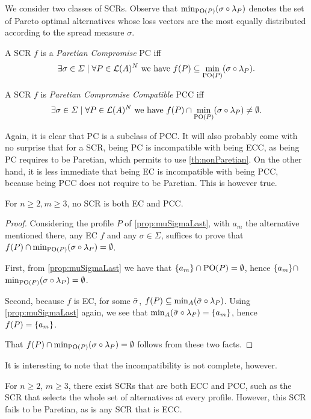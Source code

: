 We consider two classes of \acp{SCR}. 
Observe that $\mustar$ denotes the set of Pareto optimal alternatives whose loss vectors are the most equally distributed according to the spread measure $\sigma$.

\begin{definition} A \ac{SCR} $f$ is a \emph{Paretian Compromise} PC iff \[\exists \sigma \in \Sigma \suchthat \forall P \in \linors^N \text{ we have } f(P) \subseteq \mustar.\]
\end{definition}

\begin{definition} A \ac{SCR} $f$ is \emph{Paretian Compromise Compatible} PCC iff \[\exists \sigma \in \Sigma \suchthat \forall P \in \linors^N \text{ we have } f(P) \cap \mustar \neq \emptyset.\]
\end{definition}

Again, it is clear that PC is a subclass of PCC. It will also probably come with no surprise that for a \ac{SCR}, being PC is incompatible with being ECC, as being PC requires to be Paretian, which permits to use \cref{th:nonParetian}. On the other hand, it is less immediate that being EC is incompatible with
being PCC, because being PCC does not require to be Paretian. This is however true.

\begin{theorem} \label{th:incompatibility} 
	For $n ≥ 2, m ≥ 3$, no \ac{SCR} is both EC and PCC.
\end{theorem}
\begin{proof}	
	Considering the profile $P$ of \cref{prop:muSigmaLast}, with $a_m$ the alternative mentioned there, any EC $f$ and any $\sigma \in \Sigma$, suffices to prove that $f(P) \cap {\mustar[\sigma][P]} = \emptyset$.
	
	First, from \cref{prop:muSigmaLast} we have that
	$\{a_m\} \cap \text{PO}(P) = \emptyset$, hence $\{a_m\} \cap$ \break $ {\mustar[\sigma][P]} = \emptyset$. 
	
	Second, because $f$ is EC, for some $\bar{\sigma}$, $f(P) \subseteq {\musigma[\sigmatop][P]}$. Using \cref{prop:muSigmaLast} again, we see that ${\musigma[\sigmatop][P]} = \set{a_m}$, hence $f(P) = \{a_m\}$.
	
	That $f(P) \cap {\mustar[\sigma][P]} = \emptyset$ follows from these two facts.
\end{proof}

It is interesting to note that the incompatibility is not complete, however.

\begin{remark}
	For $n ≥ 2$, $m ≥ 3$, there exist \acp{SCR} that are both ECC and PCC, such as the \ac{SCR} that selects the whole set of alternatives at every profile. However, this \ac{SCR} fails to be Paretian, as is any \ac{SCR} that is ECC.
\end{remark}


